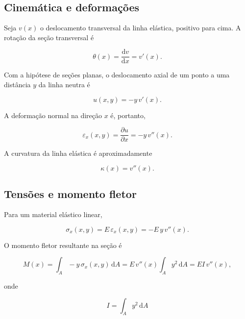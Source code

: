 \documentclass[12pt,a4paper]{article}
\newcommand{\dd}{\mathrm{d}}
\begin{document}
\subsection{Cinemática e deformações}

Seja \(v(x)\) o deslocamento transversal da linha elástica, positivo para cima. A rotação da seção transversal é

\begin{equation}
  \theta(x) = \frac{\dd v}{\dd x} = v'(x).
  \label{eq:theta}
\end{equation}

Com a hipótese de seções planas, o deslocamento axial de um ponto a uma distância \(y\) da linha neutra é

\begin{equation}
  u(x,y) = -y\,v'(x).
  \label{eq:u}
\end{equation}

A deformação normal na direção \(x\) é, portanto,

\begin{equation}
  \varepsilon_x(x,y) = \frac{\partial u}{\partial x}
  = -y\,v''(x).
  \label{eq:epsilon}
\end{equation}

A curvatura da linha elástica é aproximadamente

\begin{equation}
  \kappa(x) = v''(x).
  \label{eq:curvatura}
\end{equation}

\subsection{Tensões e momento fletor}

Para um material elástico linear,

\begin{equation}
  \sigma_x(x,y) = E\,\varepsilon_x(x,y) = -E\,y\,v''(x).
  \label{eq:sigma}
\end{equation}

O momento fletor resultante na seção é

\begin{equation}
  M(x) = \int_A -y\,\sigma_x(x,y)\,\dd A
       = E\,v''(x)\int_A y^2\,\dd A
       = EI\,v''(x),
  \label{eq:momento}
\end{equation}

onde

\begin{equation}
  I = \int_A y^2\,\dd A
  \label{eq:I}
\end{equation}
\end{document}
